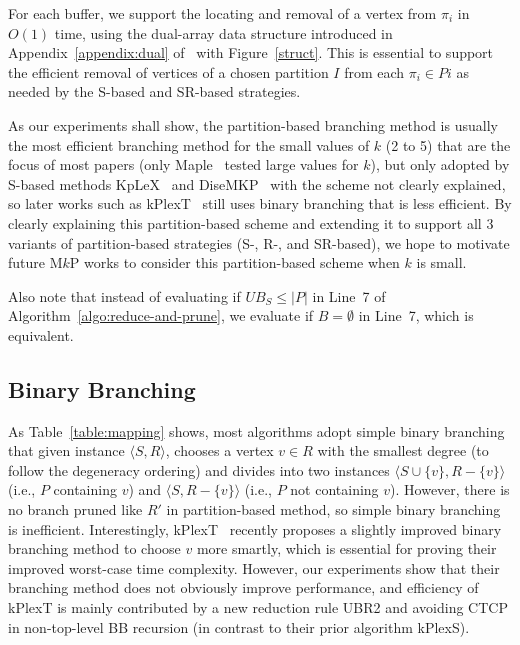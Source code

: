 \documentclass[sigconf, nonacm]{acmart}
\begin{document}
For each buffer, we support the locating and removal of a vertex from $\pi_i$ in $O(1)$ time, using the dual-array data structure introduced in Appendix~\ref{appendix:dual} of~\cite{tech_report} with Figure~\ref{struct}. This is essential to support the efficient removal of vertices of a chosen partition $I$ from each $\pi_i\in Pi$ as needed by the S-based and SR-based strategies.

As our experiments shall show, the partition-based branching method is usually the most efficient branching method for the small values of $k$ (2 to 5) that are the focus of most papers (only Maple~\cite{Maple} tested large values for $k$), but only adopted by S-based methods KpLeX~\cite{KpLeX-MKP} and DiseMKP~\cite{DiseMKP} with the scheme not clearly explained, so later works such as kPlexT~\cite{kPlexT} still uses binary branching that is less efficient. By clearly explaining this partition-based scheme and extending it to support all 3 variants of partition-based strategies (S-, R-, and SR-based), we hope to motivate future M$k$P works to consider this partition-based scheme when $k$ is small.

Also note that instead of evaluating if $UB_S\leq |P|$ in Line~7 of Algorithm~\ref{algo:reduce-and-prune}, we evaluate if $B=\emptyset$ in Line~7, which is equivalent.

\vspace{-3mm}
\subsection{Binary Branching}
As Table~\ref{table:mapping} shows, most algorithms adopt simple binary branching that given instance $\langle S, R\rangle$, chooses a vertex $v\in R$ with the smallest degree (to follow the degeneracy ordering) and divides into two instances $\langle S\cup\{v\}, R-\{v\}\rangle$ (i.e., $P$ containing $v$) and $\langle S, R-\{v\}\rangle$ (i.e., $P$ not containing $v$). However, there is no branch pruned like $R'$ in partition-based method, so simple binary branching is inefficient. Interestingly, kPlexT~\cite{kPlexT} recently proposes a slightly improved binary branching method to choose $v$ more smartly, which is essential for proving their improved worst-case time complexity. However, our experiments show that their branching method does not obviously improve performance, and efficiency of kPlexT is mainly contributed by a new reduction rule UBR2 and avoiding CTCP in non-top-level BB recursion (in contrast to their prior algorithm kPlexS).
\end{document}
